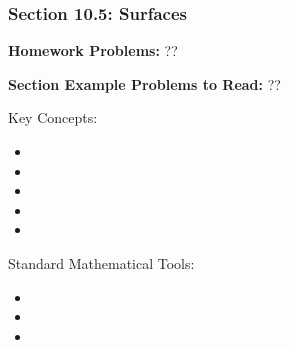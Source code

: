%
% 

\begin{frame}
\frametitle{\Large {\color[rgb]{0.02,0.20,1.0} Section 10.5: Surfaces}}
\scriptsize

\vspace{0.2cm}
{\bf Homework Problems:} \quad ??

\vspace{0.2cm}

{\bf Section Example Problems to Read:} \quad ??

\vspace{0.2cm}

\begin{block}{Key Concepts:}
\begin{itemize}
	\item[...] 
	\item[...] 
	\item[...] 
	\item[...] 
	\item[...] 
\end{itemize}
\end{block}

\begin{block}{Standard Mathematical Tools:}
\begin{itemize}
	\item[...] 
	\item[...] 
	\item[...] 
\end{itemize}
\end{block}

\end{frame}

